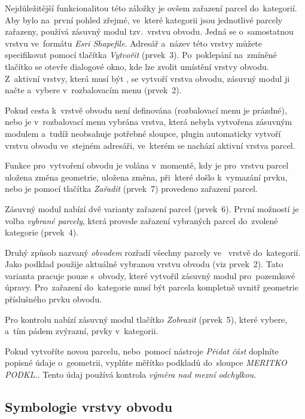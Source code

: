 Nejdůležitější funkcionalitou této záložky je ovšem zařazení parcel
do~kategorií. Aby bylo na~první pohled zřejmé, ve~které kategorii jsou
jednotlivé parcely zařazeny, používá zásuvný modul tzv.~vrstvu
obvodu. Jedná se o~samostatnou vrstvu ve~formátu
\textit{Esri Shapefile}. Adresář a~název této vrstvy můžete specifikovat
pomocí tlačítka \textit{Vytvořit} (prvek~3). Po~poklepání na~zmíněné
tlačítko se otevře dialogové okno, kde lze zvolit umístění vrstvy
obvodu. Z~aktivní vrstvy, která musí být , se vytvoří vrstva
obvodu, zásuvný modul ji načte a~vybere v~rozbalovacím menu (prvek~2).

Pokud cesta k~vrstvě obvodu není definována (rozbalovací menu je
prázdné), nebo je v~rozbalovací menu vybrána vrstva, která nebyla
vytvořena zásuvným modulem a~tudíž neobsahuje potřebné sloupce, plugin
automaticky vytvoří vrstvu obvodu ve~stejném adresáři, ve~kterém se
nachází aktivní vrstva parcel.

Funkce pro~vytvoření obvodu je volána v~momentě, kdy je pro~vrstvu
parcel uložena změna geometrie, uložena změna, při~které došlo
k~vymazání prvku, nebo je pomocí tlačítka \textit{Zařadit} (prvek~7)
provedeno zařazení parcel.

Zásuvný modul nabízí dvě varianty zařazení parcel (prvek~6). První
možností je volba \textit{vybrané parcely}, která provede zařazení
vybraných parcel do~zvolené kategorie (prvek~4).

Druhý způsob nazvaný \textit{obvodem} rozřadí všechny parcely
ve~ vrstvě do~ka\-tegorií. Jako podklad použije aktuálně
vybranou vrstvu obvodu (viz prvek~2). Tato varianta pracuje pouze
s~obvody, které vytvořil zásuvný modul pro~pozemkové
úpravy. Pro~zařazení do~kategorie musí být parcela kompletně uvnitř
geometrie příslušného prvku obvodu.

Pro kontrolu nabízí zásuvný modul tlačítko \textit{Zobrazit}
(prvek~5), které vybere, a~tím pádem zvýrazní, prvky v~kategorii.

Pokud vytvoříte novou parcelu, nebo~pomocí nástroje \textit{Přidat
  část} doplníte popis\-né údaje o~geometrii, vyplňte měřítko podkladů
do~sloupce \textit{MERITKO PODKL.}. Tento údaj používá kontrola
\textit{výměra nad mezní odchylkou}.

\subsection{Symbologie vrstvy obvodu}
\label{manual_editace_symbologie}

